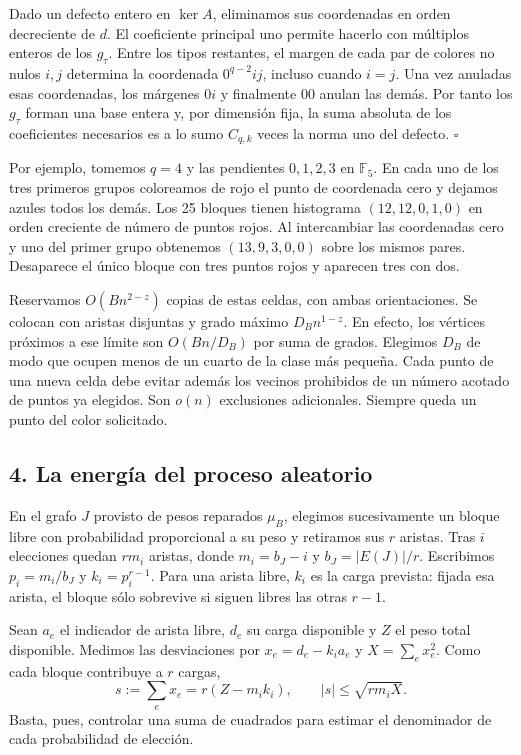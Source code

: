 \documentclass[spanish,11pt,a4paper]{article}
\begin{document}
Dado un defecto entero en \(\ker A\), eliminamos sus coordenadas en orden decreciente de \(d\). El coeficiente principal uno permite hacerlo con múltiplos enteros de los \(g_\tau\). Entre los tipos restantes, el margen de cada par de colores no nulos \(i,j\) determina la coordenada \(0^{q-2}ij\), incluso cuando \(i=j\). Una vez anuladas esas coordenadas, los márgenes \(0i\) y finalmente \(00\) anulan las demás. Por tanto los \(g_\tau\) forman una base entera y, por dimensión fija, la suma absoluta de los coeficientes necesarios es a lo sumo \(C_{q,k}\) veces la norma uno del defecto. \(\square\)

Por ejemplo, tomemos \(q=4\) y las pendientes \(0,1,2,3\) en \(\mathbb F_5\). En cada uno de los tres primeros grupos coloreamos de rojo el punto de coordenada cero y dejamos azules todos los demás. Los 25 bloques tienen histograma \((12,12,0,1,0)\) en orden creciente de número de puntos rojos. Al intercambiar las coordenadas cero y uno del primer grupo obtenemos \((13,9,3,0,0)\) sobre los mismos pares. Desaparece el único bloque con tres puntos rojos y aparecen tres con dos.

Reservamos \(O(Bn^{2-z})\) copias de estas celdas, con ambas orientaciones. Se colocan con aristas disjuntas y grado máximo \(D_Bn^{1-z}\). En efecto, los vértices próximos a ese límite son \(O(Bn/D_B)\) por suma de grados. Elegimos \(D_B\) de modo que ocupen menos de un cuarto de la clase más pequeña. Cada punto de una nueva celda debe evitar además los vecinos prohibidos de un número acotado de puntos ya elegidos. Son \(o(n)\) exclusiones adicionales. Siempre queda un punto del color solicitado.

\subsection{4. La energía del proceso aleatorio}\label{la-energuxeda-del-proceso-aleatorio}

En el grafo \(J\) provisto de pesos reparados \(\mu_B\), elegimos sucesivamente un bloque libre con probabilidad proporcional a su peso y retiramos sus \(r\) aristas. Tras \(i\) elecciones quedan \(rm_i\) aristas, donde \(m_i=b_J-i\) y \(b_J=|E(J)|/r\). Escribimos \(p_i=m_i/b_J\) y \(k_i=p_i^{r-1}\). Para una arista libre, \(k_i\) es la carga prevista: fijada esa arista, el bloque sólo sobrevive si siguen libres las otras \(r-1\).

Sean \(a_e\) el indicador de arista libre, \(d_e\) su carga disponible y \(Z\) el peso total disponible. Medimos las desviaciones por \(x_e=d_e-k_i a_e\) y \(X=\sum_e x_e^2\). Como cada bloque contribuye a \(r\) cargas, \[s:=\sum_e x_e=r(Z-m_i k_i),\qquad |s|\le\sqrt{rm_i X}.\] Basta, pues, controlar una suma de cuadrados para estimar el denominador de cada probabilidad de elección.
\end{document}
